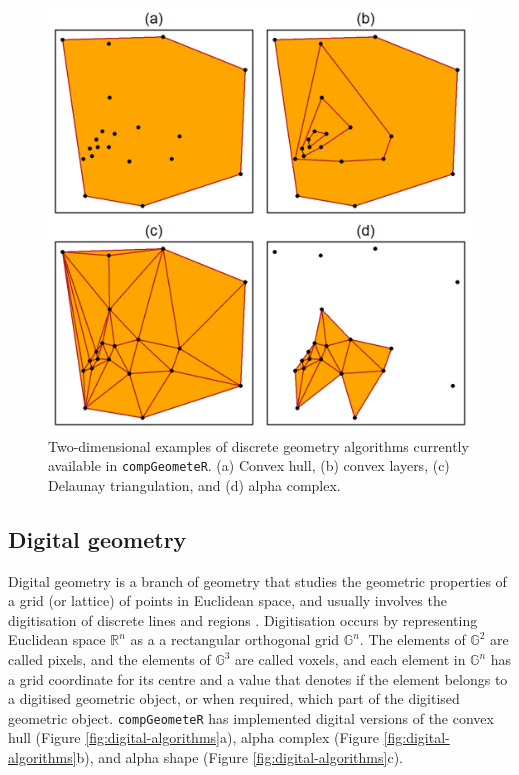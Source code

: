 \documentclass[12pt, a4paper]{article}
\begin{document}
\begin{figure}[ht]
\centering
\includegraphics{figures/figure-1/figure-1.png}
\caption{Two-dimensional examples of discrete geometry algorithms currently available in \texttt{compGeometeR}. (a) Convex hull, (b) convex layers, (c) Delaunay triangulation, and (d) alpha complex.}
\label{fig:discrete-algorithms}
\end{figure}

\subsection{Digital geometry}

Digital geometry is a branch of geometry that studies the geometric properties of a grid (or lattice) of points in Euclidean space, and usually involves the digitisation of discrete lines and regions \citep{rosenfeld-1989}.  Digitisation occurs by representing Euclidean space $\mathbb{R}^n$ as a a rectangular orthogonal grid $\mathbb{G}^n$.  The elements of $\mathbb{G}^2$ are called pixels, and the elements of $\mathbb{G}^3$ are called voxels, and each element in $\mathbb{G}^n$ has a grid coordinate for its centre \citep{klette-2004} and a value that denotes if the element belongs to a digitised geometric object, or when required, which part of the digitised geometric object.  \texttt{compGeometeR} has implemented digital versions of the convex hull (Figure \ref{fig:digital-algorithms}a), alpha complex (Figure \ref{fig:digital-algorithms}b), and alpha shape (Figure \ref{fig:digital-algorithms}c).
\end{document}
